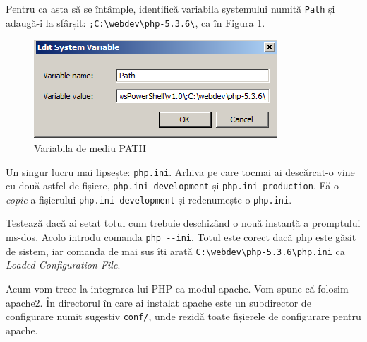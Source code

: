 Pentru ca asta să
se întâmple, identifică
variabila systemului numită \texttt{Path}
și adaugă-i la sfârșit:
\texttt{;C:{\textbackslash}webdev{\textbackslash}php-5.3.6{\textbackslash}}, ca în
Figura \ref{img:win env path}.
\begin{figure}[ht!]
  \centering
    \includegraphics[width=180bp]{cap01/Screenshot-21.png}
  \caption{Variabila de mediu PATH}
  \label{img:win env path}
\end{figure}


Un singur lucru mai lipsește: \texttt{php.ini}. Arhiva pe care tocmai
ai descărcat-o vine cu două astfel de fișiere, \texttt{php.ini-development} și
\texttt{php.ini-production}. Fă o \textit{copie} a fișierului
\texttt{php.ini-development} și redenumește-o \texttt{php.ini}.

Testează dacă ai setat totul cum trebuie deschizând o nouă instanță
a promptului ms-dos.
Acolo introdu comanda \texttt{php -{}-ini}.
Totul este corect dacă php este găsit de sistem, iar comanda de mai sus îți
arată \texttt{C:{\textbackslash}webdev{\textbackslash}php-5.3.6{\textbackslash}php.ini}
ca \textit{Loaded Configuration File}.


\vspace{1em}

Acum vom trece la integrarea lui PHP ca modul apache. Vom spune că folosim
apache2. În directorul în care ai instalat apache este un subdirector de configurare
numit sugestiv \texttt{conf/}, unde rezidă toate fișierele de configurare
pentru apache.

